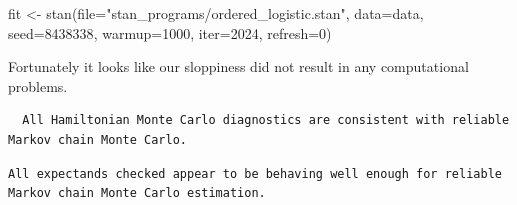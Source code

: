 \documentclass[
  letterpaper,
  DIV=11,
  numbers=noendperiod]{scrartcl}
\newenvironment{Shaded}{\begin{snugshade}}{\end{snugshade}}
\newcommand{\AttributeTok}[1]{\textcolor[rgb]{0.40,0.45,0.13}{#1}}
\newcommand{\ConstantTok}[1]{\textcolor[rgb]{0.56,0.35,0.01}{#1}}
\newcommand{\DecValTok}[1]{\textcolor[rgb]{0.68,0.00,0.00}{#1}}
\newcommand{\FunctionTok}[1]{\textcolor[rgb]{0.28,0.35,0.67}{#1}}
\newcommand{\NormalTok}[1]{\textcolor[rgb]{0.00,0.23,0.31}{#1}}
\newcommand{\OtherTok}[1]{\textcolor[rgb]{0.00,0.23,0.31}{#1}}
\newcommand{\SpecialCharTok}[1]{\textcolor[rgb]{0.37,0.37,0.37}{#1}}
\newcommand{\StringTok}[1]{\textcolor[rgb]{0.13,0.47,0.30}{#1}}
\begin{document}
\begin{Shaded}
\begin{Highlighting}[]
\NormalTok{fit }\OtherTok{\textless{}{-}} \FunctionTok{stan}\NormalTok{(}\AttributeTok{file=}\StringTok{"stan\_programs/ordered\_logistic.stan"}\NormalTok{,}
            \AttributeTok{data=}\NormalTok{data, }\AttributeTok{seed=}\DecValTok{8438338}\NormalTok{,}
            \AttributeTok{warmup=}\DecValTok{1000}\NormalTok{, }\AttributeTok{iter=}\DecValTok{2024}\NormalTok{, }\AttributeTok{refresh=}\DecValTok{0}\NormalTok{)}
\end{Highlighting}
\end{Shaded}

Fortunately it looks like our sloppiness did not result in any
computational problems.

\begin{Shaded}
\end{Shaded}

\begin{verbatim}
  All Hamiltonian Monte Carlo diagnostics are consistent with reliable
Markov chain Monte Carlo.
\end{verbatim}

\begin{Shaded}
\end{Shaded}

\begin{verbatim}
All expectands checked appear to be behaving well enough for reliable
Markov chain Monte Carlo estimation.
\end{verbatim}
\end{document}
